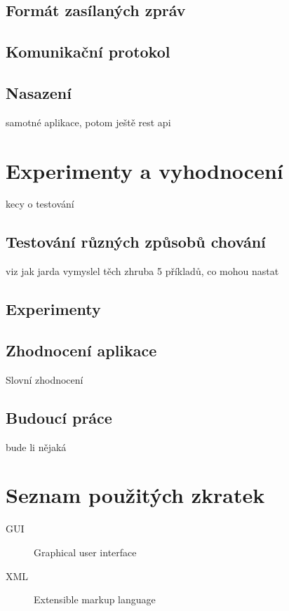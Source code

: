 \documentclass[thesis=M,czech]{FITthesis}[2014/05/07]
\begin{document}
\section{Formát zasílaných zpráv}
\section{Komunikační protokol}
\section{Nasazení}
samotné aplikace, potom ještě rest api

\chapter{Experimenty a vyhodnocení}
\label{chap:tests}
kecy o testování
\section{Testování různých způsobů chování}
viz jak jarda vymyslel těch zhruba 5 příkladů, co mohou nastat
\section{Experimenty}

\section{Zhodnocení aplikace}
Slovní zhodnocení
\section{Budoucí práce}
bude li nějaká

\begin{conclusion}
\end{conclusion}




\appendix

\chapter{Seznam použitých zkratek}
\begin{description}
	\item[GUI] Graphical user interface
	\item[XML] Extensible markup language
\end{description}
\end{document}
